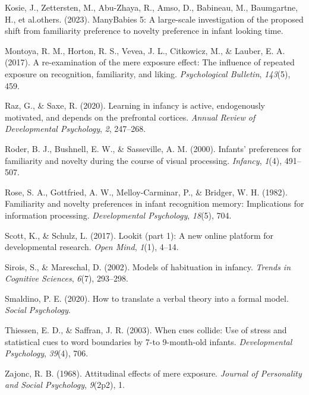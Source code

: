 \documentclass[10pt, letterpaper]{article}
\newenvironment{CSLReferences}%
  {}%
  {\par}
\begin{document}
\begin{CSLReferences}{1}{0}
\leavevmode{}%
Kosie, J., Zettersten, M., Abu-Zhaya, R., Amso, D., Babineau, M.,
Baumgartne, H., et al.others. (2023). ManyBabies 5: A large-scale
investigation of the proposed shift from familiarity preference to
novelty preference in infant looking time.

\leavevmode{}%
Montoya, R. M., Horton, R. S., Vevea, J. L., Citkowicz, M., \& Lauber,
E. A. (2017). A re-examination of the mere exposure effect: The
influence of repeated exposure on recognition, familiarity, and liking.
\emph{Psychological Bulletin}, \emph{143}(5), 459.

\leavevmode{}%
Raz, G., \& Saxe, R. (2020). Learning in infancy is active, endogenously
motivated, and depends on the prefrontal cortices. \emph{Annual Review
of Developmental Psychology}, \emph{2}, 247--268.

\leavevmode{}%
Roder, B. J., Bushnell, E. W., \& Sasseville, A. M. (2000). Infants'
preferences for familiarity and novelty during the course of visual
processing. \emph{Infancy}, \emph{1}(4), 491--507.

\leavevmode{}%
Rose, S. A., Gottfried, A. W., Melloy-Carminar, P., \& Bridger, W. H.
(1982). Familiarity and novelty preferences in infant recognition
memory: Implications for information processing. \emph{Developmental
Psychology}, \emph{18}(5), 704.

\leavevmode{}%
Scott, K., \& Schulz, L. (2017). Lookit (part 1): A new online platform
for developmental research. \emph{Open Mind}, \emph{1}(1), 4--14.

\leavevmode{}%
Sirois, S., \& Mareschal, D. (2002). Models of habituation in infancy.
\emph{Trends in Cognitive Sciences}, \emph{6}(7), 293--298.

\leavevmode{}%
Smaldino, P. E. (2020). How to translate a verbal theory into a formal
model. \emph{Social Psychology}.

\leavevmode{}%
Thiessen, E. D., \& Saffran, J. R. (2003). When cues collide: Use of
stress and statistical cues to word boundaries by 7-to 9-month-old
infants. \emph{Developmental Psychology}, \emph{39}(4), 706.

\leavevmode{}%
Zajonc, R. B. (1968). Attitudinal effects of mere exposure.
\emph{Journal of Personality and Social Psychology}, \emph{9}(2p2), 1.

\end{CSLReferences}


\end{document}
